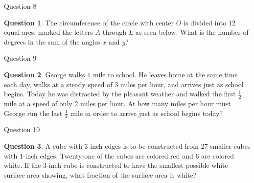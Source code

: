 \documentclass[handout]{beamer}
\theoremstyle{definition}
\newtheorem{quest}{Question}
\begin{document}
\begin{frame}{Question 8}
\begin{quest}
The circumference of the circle with center $O$ is divided into 12 equal arcs, marked the letters $A$ through $L$ as seen below. What is the number of degrees in the sum of the angles $x$ and $y$?
\end{quest}
\begin{center}
\end{center}
\end{frame}

\begin{frame}{Question 9}
\begin{quest}
George walks $1$ mile to school. He leaves home at the same time each day, walks at a steady speed of $3$ miles per hour, and arrives just as school begins. Today he was distracted by the pleasant weather and walked the first $\frac{1}{2}$ mile at a speed of only $2$ miles per hour. At how many miles per hour must George run the last $\frac{1}{2}$ mile in order to arrive just as school begins today?
\end{quest}
\end{frame}

\begin{frame}{Question 10}
\begin{quest}
A cube with 3-inch edges is to be constructed from 27 smaller cubes with 1-inch edges. Twenty-one of the cubes are colored red and 6 are colored white. If the 3-inch cube is constructed to have the smallest possible white surface area showing, what fraction of the surface area is white?
\end{quest}
\end{frame}
\end{document}
